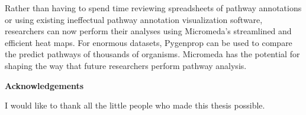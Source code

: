 Rather than having to spend time reviewing spreadsheets of pathway annotations or using existing ineffectual pathway annotation visualization software, researchers can now perform their analyses using Micromeda's streamlined and efficient heat maps. For enormous datasets, Pygenprop can be used to compare the predict pathways of thousands of organisms. Micromeda has the potential for shaping the way that future researchers perform pathway analysis.

\cleardoublepage


\begin{center}\textbf{Acknowledgements}\end{center}

I would like to thank all the little people who made this thesis possible.
\cleardoublepage

\renewcommand\contentsname{Table of Contents}
\tableofcontents
\cleardoublepage
{}    %

\listoftables
\cleardoublepage
{}		%

\listoffigures
\cleardoublepage
{}		%

\printglossaries
\cleardoublepage
{}		%


